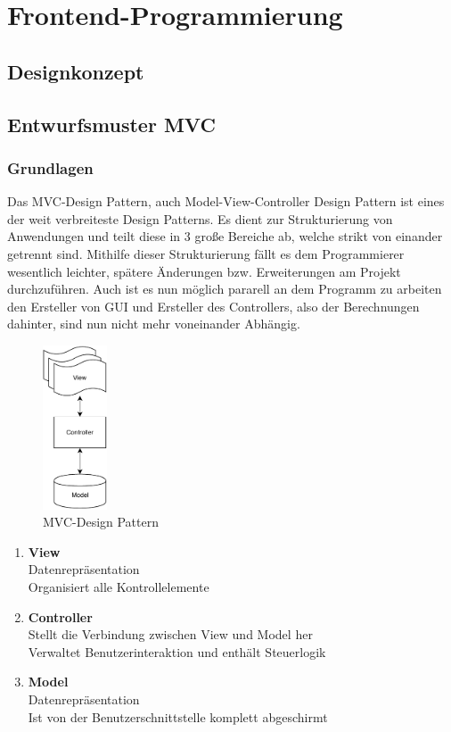 \section{Frontend-Programmierung}
\subsection{Designkonzept}
\subsection{Entwurfsmuster MVC}
\subsubsection{Grundlagen}
Das MVC-Design Pattern, auch Model-View-Controller Design Pattern ist eines der weit verbreiteste Design Patterns. Es dient zur Strukturierung von Anwendungen und teilt diese in 3 große Bereiche ab, welche strikt von einander getrennt sind.
Mithilfe dieser Strukturierung fällt es dem Programmierer wesentlich leichter, spätere Änderungen bzw. Erweiterungen am Projekt durchzuführen. Auch ist es nun möglich pararell an dem Programm zu arbeiten den Ersteller von GUI und Ersteller des Controllers, also der Berechnungen dahinter, sind nun nicht mehr voneinander Abhängig.
\newpage
\begin{figure}
    \vspace{-310pt}
    \begin{center}
        \includegraphics[width=0.17\textwidth]{fig/ainf/ModelViewController.pdf}
    \end{center}
    \caption{MVC-Design Pattern}
    \vspace{20pt}
\end{figure}


\begin{enumerate}
    \item \textbf{View}  \\
    Datenrepräsentation\\
    Organisiert alle Kontrollelemente
    \item \textbf{Controller} \\
    Stellt die Verbindung zwischen View und Model her\\
    Verwaltet Benutzerinteraktion und enthält Steuerlogik
    \item \textbf{Model} \\
    Datenrepräsentation\\
    Ist von der Benutzerschnittstelle komplett abgeschirmt
\end{enumerate}
\vspace{20pt}


